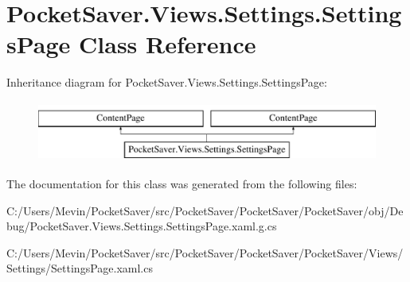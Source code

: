 \hypertarget{class_pocket_saver_1_1_views_1_1_settings_1_1_settings_page}{}\section{Pocket\+Saver.\+Views.\+Settings.\+Settings\+Page Class Reference}
\label{class_pocket_saver_1_1_views_1_1_settings_1_1_settings_page}
Inheritance diagram for Pocket\+Saver.\+Views.\+Settings.\+Settings\+Page\+:\begin{figure}[H]
\begin{center}
\leavevmode
\includegraphics[height=2.000000cm]{class_pocket_saver_1_1_views_1_1_settings_1_1_settings_page}
\end{center}
\end{figure}


The documentation for this class was generated from the following files\+:\begin{DoxyCompactItemize}
\item 
C\+:/\+Users/\+Mevin/\+Pocket\+Saver/src/\+Pocket\+Saver/\+Pocket\+Saver/\+Pocket\+Saver/obj/\+Debug/Pocket\+Saver.\+Views.\+Settings.\+Settings\+Page.\+xaml.\+g.\+cs\item 
C\+:/\+Users/\+Mevin/\+Pocket\+Saver/src/\+Pocket\+Saver/\+Pocket\+Saver/\+Pocket\+Saver/\+Views/\+Settings/Settings\+Page.\+xaml.\+cs\end{DoxyCompactItemize}
